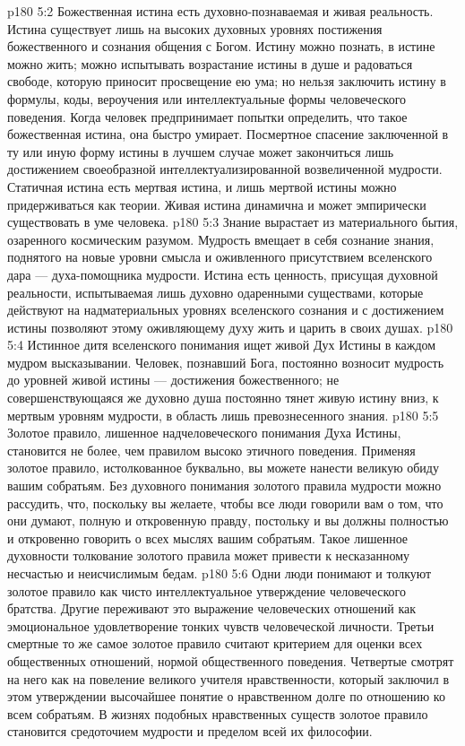 \vs p180 5:2 Божественная истина есть духовно\hyp{}познаваемая и живая реальность. Истина существует лишь на высоких духовных уровнях постижения божественного и сознания общения с Богом. Истину можно познать, в истине можно жить; можно испытывать возрастание истины в душе и радоваться свободе, которую приносит просвещение ею ума; но нельзя заключить истину в формулы, коды, вероучения или интеллектуальные формы человеческого поведения. Когда человек предпринимает попытки определить, что такое божественная истина, она быстро умирает. Посмертное спасение заключенной в ту или иную форму истины в лучшем случае может закончиться лишь достижением своеобразной интеллектуализированной возвеличенной мудрости. Статичная истина есть мертвая истина, и лишь мертвой истины можно придерживаться как теории. Живая истина динамична и может эмпирически существовать в уме человека.
\vs p180 5:3 Знание вырастает из материального бытия, озаренного космическим разумом. Мудрость вмещает в себя сознание знания, поднятого на новые уровни смысла и оживленного присутствием вселенского дара --- духа\hyp{}помощника мудрости. Истина есть ценность, присущая духовной реальности, испытываемая лишь духовно одаренными существами, которые действуют на надматериальных уровнях вселенского сознания и с достижением истины позволяют этому оживляющему духу жить и царить в своих душах.
\vs p180 5:4 Истинное дитя вселенского понимания ищет живой Дух Истины в каждом мудром высказывании. Человек, познавший Бога, постоянно возносит мудрость до уровней живой истины --- достижения божественного; не совершенствующаяся же духовно душа постоянно тянет живую истину вниз, к мертвым уровням мудрости, в область лишь превознесенного знания.
\vs p180 5:5 Золотое правило, лишенное надчеловеческого понимания Духа Истины, становится не более, чем правилом высоко этичного поведения. Применяя золотое правило, истолкованное буквально, вы можете нанести великую обиду вашим собратьям. Без духовного понимания золотого правила мудрости можно рассудить, что, поскольку вы желаете, чтобы все люди говорили вам о том, что они думают, полную и откровенную правду, постольку и вы должны полностью и откровенно говорить о всех мыслях вашим собратьям. Такое лишенное духовности толкование золотого правила может привести к несказанному несчастью и неисчислимым бедам.
\vs p180 5:6 Одни люди понимают и толкуют золотое правило как чисто интеллектуальное утверждение человеческого братства. Другие переживают это выражение человеческих отношений как эмоциональное удовлетворение тонких чувств человеческой личности. Третьи смертные то же самое золотое правило считают критерием для оценки всех общественных отношений, нормой общественного поведения. Четвертые смотрят на него как на повеление великого учителя нравственности, который заключил в этом утверждении высочайшее понятие о нравственном долге по отношению ко всем собратьям. В жизнях подобных нравственных существ золотое правило становится средоточием мудрости и пределом всей их философии.
